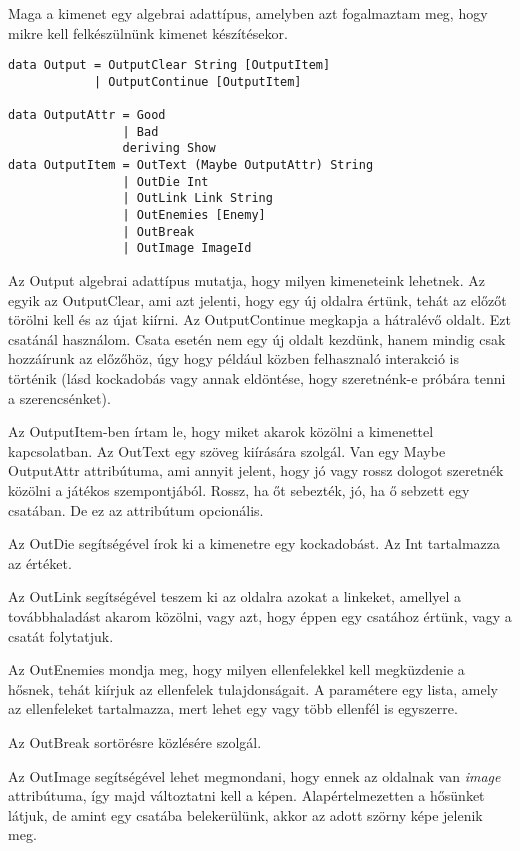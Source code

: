 \documentclass[12pt,a4paper,oneside]{report}
\newcommand{\dt}[1]{{\color{State}#1}}
\newcommand{\attr}{\emph}
\begin{document}
      Maga a kimenet egy algebrai adattípus, amelyben azt fogalmaztam
      meg, hogy mikre kell felkészülnünk kimenet készítésekor.
      \begin{verbatim}
data Output = OutputClear String [OutputItem]
            | OutputContinue [OutputItem]

data OutputAttr = Good
                | Bad
                deriving Show
data OutputItem = OutText (Maybe OutputAttr) String
                | OutDie Int
                | OutLink Link String
                | OutEnemies [Enemy]
                | OutBreak
                | OutImage ImageId

      \end{verbatim}
      Az \dt{Output} algebrai adattípus mutatja, hogy milyen kimeneteink
      lehetnek. Az egyik az \dt{OutputClear}, ami azt jelenti, hogy egy új
      oldalra értünk, tehát az előzőt törölni kell és az újat
      kiírni. Az \dt{OutputContinue} megkapja a hátralévő oldalt. Ezt
      csatánál használom. Csata esetén nem egy új oldalt kezdünk,
      hanem mindig csak hozzáírunk az előzőhöz, úgy hogy például közben
      felhasznaló interakció is történik (lásd kockadobás vagy annak
      eldöntése, hogy szeretnénk-e próbára tenni a szerencsénket).
      
      Az \dt{OutputItem}-ben írtam le, hogy miket akarok közölni a
      kimenettel kapcsolatban. Az \dt{OutText} egy szöveg kiírására
      szolgál. Van egy Maybe \dt{OutputAttr} attribútuma, ami annyit
      jelent, hogy jó vagy rossz dologot szeretnék közölni a játékos
      szempontjából. Rossz, ha őt sebezték, jó, ha ő sebzett egy
      csatában. De ez az attribútum opcionális.

      Az \dt{OutDie} segítségével írok ki a kimenetre egy kockadobást. Az
      Int tartalmazza az értéket.

      Az \dt{OutLink} segítségével teszem ki az oldalra azokat a linkeket,
      amellyel a továbbhaladást akarom közölni, vagy azt, hogy éppen
      egy csatához értünk, vagy a csatát folytatjuk.

      Az \dt{OutEnemies} mondja meg, hogy milyen ellenfelekkel kell
      megküzdenie a hősnek, tehát kiírjuk az ellenfelek
      tulajdonságait. A paramétere egy lista, amely az ellenfeleket
      tartalmazza, mert lehet egy vagy több ellenfél is egyszerre.

      Az \dt{OutBreak} sortörésre közlésére szolgál.

      Az \dt{OutImage} segítségével lehet megmondani, hogy ennek az
      oldalnak van \attr{image} attribútuma, így majd változtatni kell a
      képen. Alapértelmezetten a hősünket látjuk, de amint egy csatába
      belekerülünk, akkor az adott szörny képe jelenik meg.
\end{document}
